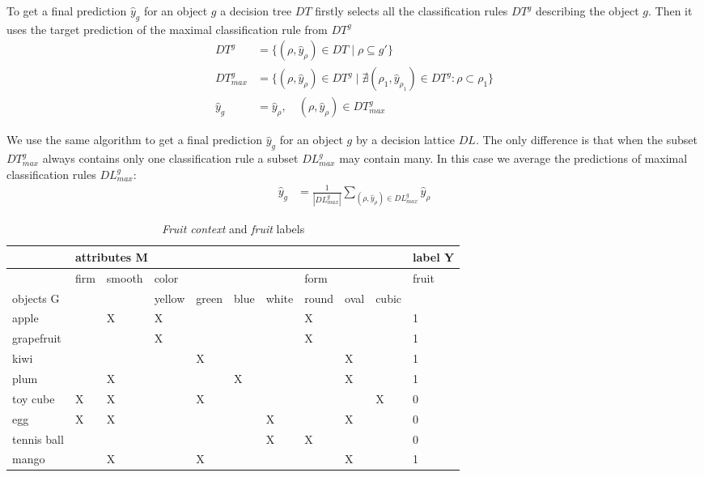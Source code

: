 \documentclass[runningheads]{llncs}
\begin{document}
To get a final prediction $\hat{y}_g$ for an object $g$ a decision tree $DT$ firstly selects all the classification rules $DT^g$ describing the object $g$. Then it uses the target prediction of the maximal classification rule from $DT^g$
\begin{align}
    DT^g &= \{(\rho, \hat{y}_\rho) \in DT \mid \rho \subseteq g'\} \\
    DT^g_{max} &= \{(\rho, \hat{y}_\rho) \in DT^g \mid \nexists (\rho_1, \hat{y}_{\rho_1}) \in DT^g: \rho \subset \rho_1\} \\
    \hat{y}_g &= \hat{y}_\rho, \quad (\rho, \hat{y}_\rho) \in DT^g_{max}
\end{align}

We use the same algorithm to get a final prediction $\hat{y}_g$ for an object $g$ by a decision lattice $DL$. The only difference is that when the subset $DT^g_{max}$ always contains only one classification rule a subset $DL^g_{max}$ may contain many. In this case we average the predictions of maximal classification rules $DL^g_{max}$:
\begin{align}
    \hat{y}_g &= \frac{1}{|DL^g_{max}|} \sum_{(\rho, \hat{y}_\rho) \in DL^g_{max}} \hat{y}_\rho
\end{align}

\begin{table}[]%
    \centering
    \tabcolsep=0.06cm
     \fontsize{6}{8}\selectfont
\begin{tabular}{l||lllllllll||l}
{} &   \multicolumn{9}{l}{attributes M} & label Y \\
\hline
{} &   firm & smooth & \multicolumn{4}{l}{color} & \multicolumn{3}{l}{form} &  fruit \\
{objects G} &     &     & yellow &  green &   blue &  white &  round &   oval &  cubic &     \\
\hline
\hline
apple       &   &   X &   X &   &   &   &   X &   &   &   1 \\
grapefruit  &   &   &   X &   &   &   &   X &   &   &   1 \\
kiwi        &   &   &   &   X &   &   &   &   X &   &   1 \\
plum        &   &   X &   &   &   X &   &   &   X &   &   1 \\
toy cube    &   X &   X &   &   X &   &   &   &   &   X & 0  \\
egg         &   X &   X &   &   &   &   X &   &   X &   & 0  \\
tennis ball &   &   &   &   &   &   X &   X &   &   &  0 \\
\hline
mango       &   &   X &   &   X &   &   &   &   X &   &   1 \\
\end{tabular}
    \caption{\emph{Fruit context} and \emph{fruit} labels}
    \label{tab:fruit_ctx}
\end{table}
\end{document}
